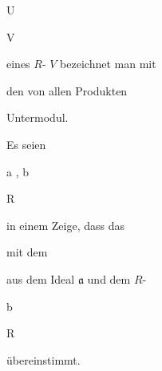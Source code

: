 \mavergleichskette

{\vergleichskette

{U
}

{ \subseteq }{ V
}

{  }{
}

{    }{
}

{   }{
}

}
{}{}{}
eines
$R$-
$V$ bezeichnet man mit

 den von allen Produkten


 {  }


Untermodul.



{}

{


Es seien


\mavergleichskette

{\vergleichskette

{ {\mathfrak a} , {\mathfrak b}
}

{ \subseteq }{ R
}

{  }{
}

{    }{
}

{   }{
}

}
{}{}{}
in einem
Zeige, dass das


 mit dem


 aus dem Ideal ${\mathfrak a}$ und dem
$R$-


\mavergleichskette

{\vergleichskette

{ {\mathfrak b}
}

{ \subseteq }{ R
}

{  }{
}

{    }{
}

{   }{
}

}
{}{}{}
übereinstimmt.


}

{} {}



{}

